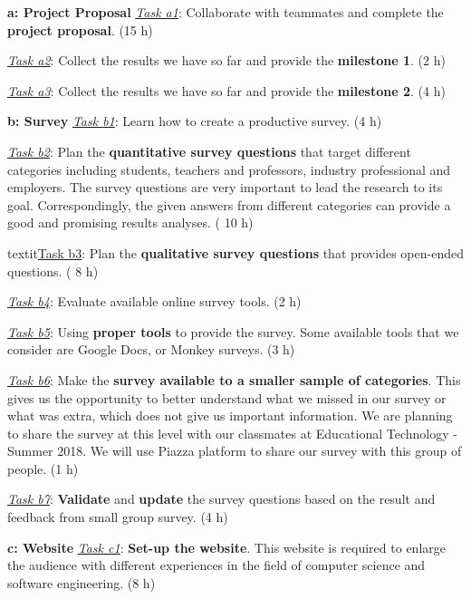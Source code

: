 \documentclass{sigchi}
\begin{document}
\textbf{a: Project Proposal}\newline
\textit{\underline{Task a1}}: Collaborate with teammates and complete the \textbf{project proposal}. (15 h)

\textit{\underline{Task a2}}: Collect the results we have so far and provide the \textbf{milestone 1}. (2 h)

\textit{\underline{Task a3}}: Collect the results we have so far and provide the \textbf{milestone 2}. (4 h)

\textbf{b: Survey}\newline
\textit{\underline{Task b1}}: Learn how to create a productive survey. (4 h)

\textit{\underline{Task b2}}: Plan the \textbf{quantitative survey questions} that target different categories including students, teachers and professors, industry professional and employers. The survey questions are very important to lead the research to its goal. Correspondingly, the given answers from different categories can provide a good and promising results analyses. ( 10 h)

textit{\underline{Task b3}}: Plan the \textbf{qualitative survey questions} that provides open-ended questions. ( 8 h)

\textit{\underline{Task b4}}: Evaluate available online survey tools. (2 h)

\textit{\underline{Task b5}}: Using \textbf{proper tools} to provide the survey. Some available tools that we consider are Google Docs, or Monkey surveys. (3 h)

\textit{\underline{Task b6}}: Make the \textbf{survey available to a smaller sample of categories}. This gives us the opportunity to better understand what we missed in our survey or what was extra, which does not give us important information. We are planning to share the survey at this level with our classmates at Educational Technology - Summer 2018. We will use Piazza platform to share our survey with this group of people. (1 h)

\textit{\underline{Task b7}}: \textbf{Validate} and \textbf{update} the survey questions based on the result and feedback from small group survey. (4 h)\newline


\textbf{c: Website}\newline
\textit{\underline{Task c1}}: \textbf{Set-up the website}. This website is required to enlarge the audience with different  experiences in the field of computer science and software engineering. (8 h)
\end{document}
